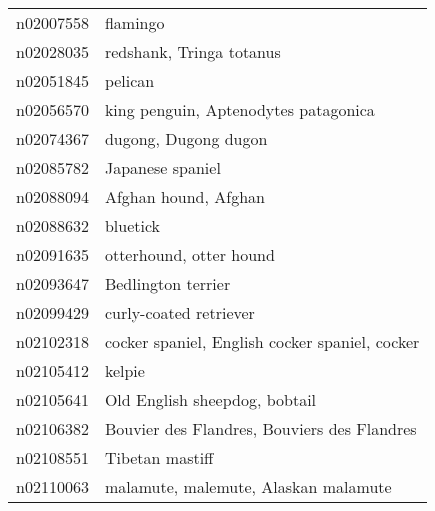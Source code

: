 \begin{appendices}
\begin{scriptsize}
\begin{longtabu}{X|X[4]}
    		n02007558 &                                                                                                                   flamingo \tabularnewline
    		n02028035 &                                                                                                   redshank, Tringa totanus \tabularnewline
    		n02051845 &                                                                                                                    pelican \tabularnewline
    		n02056570 &                                                                                       king penguin, Aptenodytes patagonica \tabularnewline
    		n02074367 &                                                                                                       dugong, Dugong dugon \tabularnewline
    		n02085782 &                                                                                                           Japanese spaniel \tabularnewline
    		n02088094 &                                                                                                       Afghan hound, Afghan \tabularnewline
    		n02088632 &                                                                                                                   bluetick \tabularnewline
    		n02091635 &                                                                                                    otterhound, otter hound \tabularnewline
    		n02093647 &                                                                                                         Bedlington terrier \tabularnewline
    		n02099429 &                                                                                                     curly-coated retriever \tabularnewline
    		n02102318 &                                                                             cocker spaniel, English cocker spaniel, cocker \tabularnewline
    		n02105412 &                                                                                                                     kelpie \tabularnewline
    		n02105641 &                                                                                              Old English sheepdog, bobtail \tabularnewline
    		n02106382 &                                                                                Bouvier des Flandres, Bouviers des Flandres \tabularnewline
    		n02108551 &                                                                                                            Tibetan mastiff \tabularnewline
    		n02110063 &                                                                                       malamute, malemute, Alaskan malamute \tabularnewline

\end{longtabu}
\end{scriptsize}
\end{appendices}
